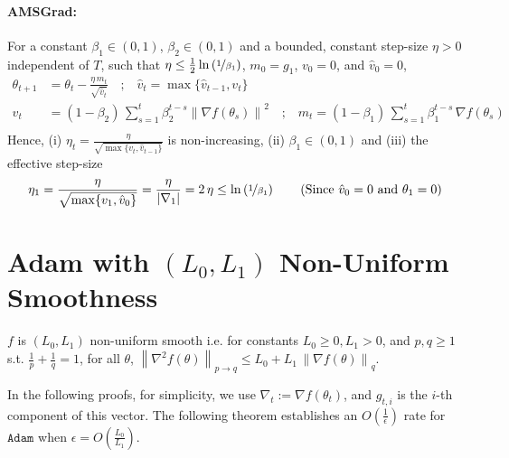 \documentclass{article}
\newcommand{\normsq}[1]{\left\|#1 \right\|^{2}}
\newcommand{\norm}[1]{\left\|#1 \right\|}
\newcommand{\tht}{\theta_t}
\newcommand{\thtt}{\theta_{t+1}}
\newcommand{\Adam}{\texttt{Adam}}
\begin{document}
\paragraph{AMSGrad:} For a constant $\beta_1 \in (0,1)$, $\beta_2 \in (0,1)$ and a bounded, constant step-size $\eta > 0$ independent of $T$, such that $\eta \leq \frac{1}{2} \ln\left(\nicefrac{1}{\beta_1}\right)$, $m_0 = g_{1}$, $v_{0} =0$, and $\hat{v}_{0} = 0$,
\begin{align*}
\thtt & = \tht - \frac{\eta \, m_t}{\sqrt{\hat{v}_t}} \quad \text{;} \quad \hat{v}_t = \max\{\hat{v}_{t-1}, v_{t}\} \\
v_t & = (1-\beta_2) \, \sum_{s=1}^t \beta_2^{t-s} \normsq{\nabla f(\theta_s)} \quad \text{;} \quad m_t = (1 - \beta_1) \, \sum_{s = 1}^{t} \beta_1^{t-s} \, \nabla f(\theta_s) \\
\end{align*}
Hence, (i) $\eta_t = \frac{\eta}{\sqrt{ \max\{v_t, \hat{v}_{t-1} \} }}$ is non-increasing, (ii) $\beta_1 \in (0,1)$ and (iii) the effective step-size 
\begin{align*}
\eta_1 = \frac{\eta}{\sqrt{ \max\{v_{1}, \hat{v}_{0} \} }} = \frac{\eta}{|\nabla_1|} = 2 \, \eta \leq \ln\left(\nicefrac{1}{\beta_1} \right) \tag{Since $\hat{v}_0 = 0$ and $\theta_1 = 0$}  
\end{align*}
\section{Adam with $(L_0, L_1)$ Non-Uniform Smoothness}
\label{app:gen-nus-adam}
\begin{assumption}
$f$ is $(L_0, L_1)$ non-uniform smooth i.e. for constants $L_0 \geq 0, L_1 > 0$, and $p, q \geq 1$ s.t. $\frac{1}{p} + \frac{1}{q} = 1$, for all $\theta$, $\norm{\nabla^2 f(\theta)}_{p \to q} \leq L_0 + L_1 \, \norm{\nabla f(\theta)}_{q}$.  
\label{assn:gnus}
\end{assumption}
In the following proofs, for simplicity, we use $\nabla_t :=\nabla f(\tht)$, and $g_{t,i}$ is the $i$-th component of this vector. The following theorem establishes an $O\left(\frac{1}{\epsilon}\right)$ rate for $\Adam$ when $\epsilon = O\left(\frac{L_0}{L_1}\right)$. 
\end{document}
